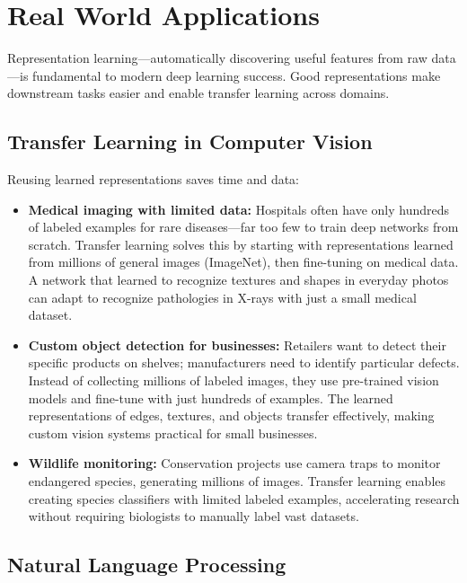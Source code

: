 
\section{Real World Applications}
\label{sec:representation-real-world}

Representation learning—automatically discovering useful features from raw data—is fundamental to modern deep learning success. Good representations make downstream tasks easier and enable transfer learning across domains.

\subsection{Transfer Learning in Computer Vision}

Reusing learned representations saves time and data:

\begin{itemize}
    \item \textbf{Medical imaging with limited data:} Hospitals often have only hundreds of labeled examples for rare diseases—far too few to train deep networks from scratch. Transfer learning solves this by starting with representations learned from millions of general images (ImageNet), then fine-tuning on medical data. A network that learned to recognize textures and shapes in everyday photos can adapt to recognize pathologies in X-rays with just a small medical dataset.
    
    \item \textbf{Custom object detection for businesses:} Retailers want to detect their specific products on shelves; manufacturers need to identify particular defects. Instead of collecting millions of labeled images, they use pre-trained vision models and fine-tune with just hundreds of examples. The learned representations of edges, textures, and objects transfer effectively, making custom vision systems practical for small businesses.
    
    \item \textbf{Wildlife monitoring:} Conservation projects use camera traps to monitor endangered species, generating millions of images. Transfer learning enables creating species classifiers with limited labeled examples, accelerating research without requiring biologists to manually label vast datasets.
\end{itemize}

\subsection{Natural Language Processing}

